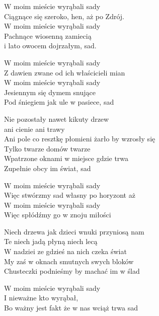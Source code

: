 \begin{text}
    \ifchorded{\hfill\break}
    W moim mieście wyrąbali sady\\
    Ciągnące się szeroko, hen, aż po Zdrój.\\
    W moim mieście wyrąbali sady\\
    Pachnące wiosenną zamiecią\\
    i lato owocem dojrzałym, sad.

    W moim mieście wyrąbali sady\\
    Z dawien zwane od ich właścicieli mian\\
    W moim mieście wyrąbali sady\\
    Jesiennym się dymem snujące\\
    Pod śniegiem jak ule w pasiece, sad

    Nie pozostały nawet kikuty drzew\\
    ani cienie ani trawy\\
    Ani pole co resztkę płomieni żarło by wzrosły się\\
    Tylko twarze domów twarze\\
    Wpatrzone oknami w miejsce gdzie trwa\\
    Zupełnie obcy im świat, sad

    W moim mieście wyrąbali sady\\
    Więc stwórzmy sad własny po horyzont aż\\
    W moim mieście wyrąbali sady\\
    Więc spłódźmy go w znoju miłości

    Niech drzewa jak dzieci wnuki przyniosą nam\\
    Te niech jadą płyną niech lecą\\
    W nadziei ze gdzieś na nich czeka świat\\
    My zaś w oknach smutnych swych bloków\\
    Chusteczki podnieśmy by machać im w ślad

    W moim mieście wyrąbali sady\\
    I nieważne kto wyrąbał,\\
    Bo ważny jest fakt że w nas wciąż trwa sad
\end{text}
